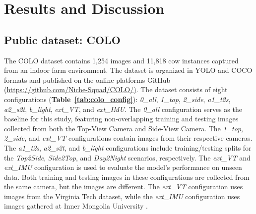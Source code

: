 \section{Results and Discussion}

\subsection*{Public dataset: COLO}

The COLO dataset contains 1,254 images and 11,818 cow instances captured from an indoor farm environment. The dataset is organized in YOLO and COCO formats and published on the online platforms GitHub \href{https://github.com/Niche-Squad/COLO/}{(https://github.com/Niche-Squad/COLO/)}. The dataset consists of eight configurations (\textbf{Table~\ref{tab:colo_config}}):
\textit{0\_all}, \textit{1\_top}, \textit{2\_side}, \textit{a1\_t2s}, \textit{a2\_s2t}, \textit{b\_light}, \textit{ext\_VT}, and \textit{ext\_IMU}. The \textit{0\_all} configuration serves as the baseline for this study, featuring non-overlapping training and testing images collected from both the Top-View Camera and Side-View Camera. The \textit{1\_top}, \textit{2\_side}, and \textit{ext\_VT} configurations contain images from their respective cameras. The \textit{a1\_t2s}, \textit{a2\_s2t}, and \textit{b\_light} configurations include training/testing splits for the \textit{Top2Side}, \textit{Side2Top}, and \textit{Day2Night} scenarios, respectively. The \textit{ext\_VT} and \textit{ext\_IMU} configuration is used to evaluate the model's performance on unseen data. Both training and testing images in these configurations are collected from the same camera, but the images are different. The \textit{ext\_VT} configuration uses images from the Virginia Tech dataset, while the \textit{ext\_IMU} configuration uses images gathered at Inner Mongolia University \citep{li_new_2024}. 

